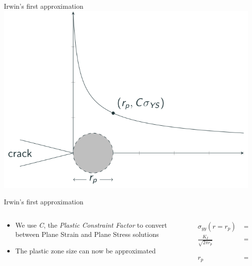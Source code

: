 \documentclass[
  letterpaper,
  ignorenonframetext,
  aspectratio=43,
  handout,
  12pt]{beamer}
\providecommand{\tightlist}{%
  \setlength{\itemsep}{0pt}\setlength{\parskip}{0pt}}
\providecommand{\tightlist}{%
\setlength{\itemsep}{0pt}\setlength{\parskip}{0pt}}
\let\Oldincludegraphics\includegraphics
\renewcommand{\includegraphics}[2][]{\Oldincludegraphics[width=\textwidth,height=0.7\textheight,keepaspectratio]{#2}}
\begin{document}
\begin{frame}{Irwin's first approximation}
\protect\hypertarget{irwins-first-approximation-1}{}
\includegraphics{../images/plastic-zone.svg}
\end{frame}

\begin{frame}{Irwin's first approximation}
\protect\hypertarget{irwins-first-approximation-2}{}
\begin{columns}[T]
\begin{column}{0.5\textwidth}
\begin{itemize}
\tightlist
\item
  We use \emph{C}, the \emph{Plastic Constraint Factor} to convert
  between Plane Strain and Plane Stress solutions
\item
  The plastic zone size can now be approximated
\end{itemize}
\end{column}

\begin{column}{0.5\textwidth}
\[\begin{aligned}
  \sigma_{yy}(r=r_p) &= C\sigma_{YS}\\
  \frac{K_I}{\sqrt{2\pi r_p}} &= C\sigma_{YS}\\
  r_p &= \frac{1}{2\pi} \left(\frac{K_I}{C\sigma_{YS}}\right)^2
\end{aligned}\]
\end{column}
\end{columns}
\end{frame}
\end{document}
